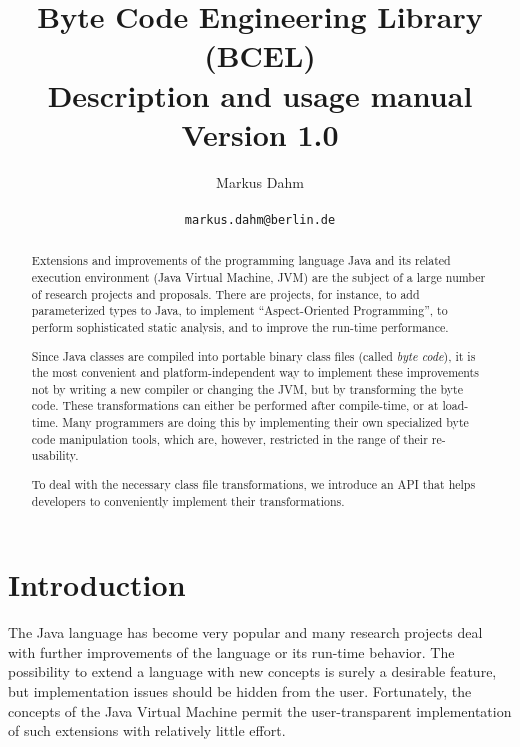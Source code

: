 \documentclass[12pt,twoside]{article}
\newcommand\jvm{{Java Virtual Machine }}
\newcommand\href[2]{#2}
\begin{document}
\title{Byte Code Engineering Library (BCEL)\\
       Description and usage manual\\
       {\small \textbf{Version 1.0}}}

\author{{\Large Markus Dahm}\\\\
        \href{mailto:markus.dahm@inf.fu-berlin.de}{\texttt{markus.dahm@berlin.de}}}

\maketitle


\begin{abstract}
Extensions  and improvements of the  programming language Java and its
related  execution environment (Java   Virtual Machine,  JVM)  are the
subject  of a large number  of research  projects and proposals. There
are  projects, for  instance, to add   parameterized types to Java, to
implement ``Aspect-Oriented Programming'', to perform sophisticated
static analysis, and to improve the run-time performance.

Since  Java classes  are  compiled into  portable  binary class  files
(called   \emph{byte   code}),  it   is   the   most  convenient   and
platform-independent  way  to  implement  these  improvements  not  by
writing a  new compiler or changing  the JVM, but  by transforming the
byte  code.   These  transformations  can either  be  performed  after
compile-time,  or at load-time.   Many programmers  are doing  this by
implementing their own specialized byte code manipulation tools, which
are, however, restricted in the range of their re-usability.

To deal with the necessary class file transformations, we introduce an
API   that   helps   developers   to  conveniently   implement   their
transformations.
\end{abstract}

\section{Introduction}\label{sec:intro}

The  Java language  \cite{gosling} has  become very  popular  and many
research projects  deal with further  improvements of the  language or
its run-time behavior.  The possibility  to extend a language with new
concepts  is surely  a  desirable feature,  but implementation  issues
should be hidden from the user.  Fortunately, the concepts of the \jvm
permit  the user-transparent  implementation of  such  extensions with
relatively little effort.
\end{document}
